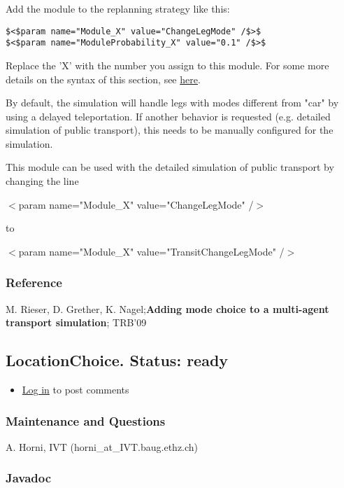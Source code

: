 \documentclass[a4paper,11pt]{report}
\begin{document}
Add the module to the replanning strategy like this:
\begin{verbatim}
$<$param name="Module_X" value="ChangeLegMode" /$>$
$<$param name="ModuleProbability_X" value="0.1" /$>$
\end{verbatim}

Replace the 'X' with the number you assign to this module. For some more details on the syntax of this section, see \href{http://matsim.org/node/478}{here}.

By default, the simulation will handle legs with modes different from  "car" by using a delayed teleportation. If another behavior is  requested (e.g. detailed simulation of public transport), this needs to  be manually configured for the simulation.

This module can be used with the detailed simulation of public transport by changing the line

$<$param name="Module\_X" value="ChangeLegMode" /$>$

to

$<$param name="Module\_X" value="TransitChangeLegMode" /$>$

\subsubsection{Reference}

M. Rieser, D. Grether, K. Nagel;\textbf{Adding mode choice to a multi-agent transport simulation}; TRB'09

\subsection{LocationChoice. Status: ready}
\begin{itemize}
	\item \href{http://www.matsim.org/user/login?destination=comment/reply/218%23comment-form}{Log in} to post comments
\end{itemize}

\subsubsection{\textbf{Maintenance and Questions}}

A. Horni, IVT (horni\_at\_IVT.baug.ethz.ch)

\subsubsection{\textbf{Javadoc}}
\end{document}
